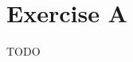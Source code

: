 \documentclass[12pt,letterpaper]{article}
\begin{document}
\section*{Exercise A}

TODO
\end{document}
